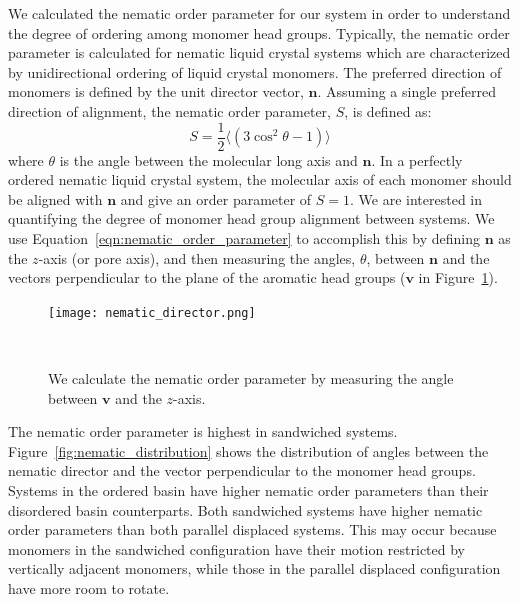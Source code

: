 \documentclass{article}
\begin{document}
  We calculated the nematic order parameter for our system in order to
  understand the degree of ordering among monomer head groups. Typically, the
  nematic order parameter is calculated for nematic liquid crystal systems which
  are characterized by unidirectional ordering of liquid crystal monomers. The
  preferred direction of monomers is defined by the unit director vector,
  $\mathbf{n}$. Assuming a single preferred direction of alignment, the nematic
  order parameter, $S$, is defined as:~\cite{chaikin_principles_1995}
  \begin{equation}
	 S = \frac{1}{2} \langle(3\cos^2\theta -1)\rangle
	\label{eqn:nematic_order_parameter}
  \end{equation}
  where $\theta$ is the angle between the molecular long axis and $\mathbf{n}$.
  In a perfectly ordered nematic liquid crystal system, the molecular axis of each
  monomer should be aligned with $\mathbf{n}$ and give an order parameter of $S=1$. 
  We are interested in quantifying the degree of monomer head group alignment 
  between systems. We use Equation~\ref{eqn:nematic_order_parameter} to accomplish this
  by defining $\mathbf{n}$ as the $z$-axis (or pore axis), and then measuring the angles,
  $\theta$, between $\mathbf{n}$ and the vectors perpendicular to the plane of
  the aromatic head groups ($\mathbf{v}$ in Figure~\ref{fig:director}). 
  
  \begin{figure}[!htb]
  \centering
  \texttt{[image: nematic\_director.png]}
  \caption{We calculate the nematic order parameter by measuring the angle
  between $\mathbf{v}$ and the $z$-axis.}~\label{fig:director}
  \end{figure}

  The nematic order parameter is highest in sandwiched systems. 
  Figure~\ref{fig:nematic_distribution} shows the distribution of angles between
  the nematic director and the vector perpendicular to the monomer head groups. 
  Systems in the ordered basin have higher nematic order parameters than their
  disordered basin counterparts. Both sandwiched systems have higher nematic order
  parameters than both parallel displaced systems. This may occur because monomers
  in the sandwiched configuration have their motion restricted by vertically adjacent
  monomers, while those in the parallel displaced configuration have more room to 
  rotate.
  
  \clearpage
\end{document}
